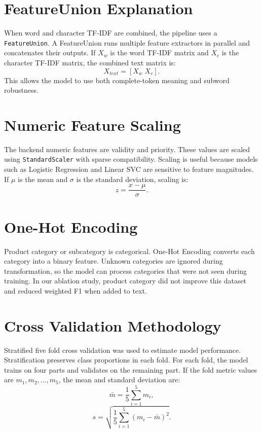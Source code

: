 \documentclass[12pt,a4paper,openany]{book}
\begin{document}
\section{FeatureUnion Explanation}
When word and character TF-IDF are combined, the pipeline uses a \texttt{FeatureUnion}. A FeatureUnion runs multiple feature extractors in parallel and concatenates their outputs. If $X_w$ is the word TF-IDF matrix and $X_c$ is the character TF-IDF matrix, the combined text matrix is:
\begin{equation}
X_{text}=[X_w \; X_c].
\end{equation}
This allows the model to use both complete-token meaning and subword robustness.

\section{Numeric Feature Scaling}
The backend numeric features are validity and priority. These values are scaled using \texttt{StandardScaler} with sparse compatibility. Scaling is useful because models such as Logistic Regression and Linear SVC are sensitive to feature magnitudes. If $\mu$ is the mean and $\sigma$ is the standard deviation, scaling is:
\begin{equation}
z=\frac{x-\mu}{\sigma}.
\end{equation}

\section{One-Hot Encoding}
Product category or subcategory is categorical. One-Hot Encoding converts each category into a binary feature. Unknown categories are ignored during transformation, so the model can process categories that were not seen during training. In our ablation study, product category did not improve this dataset and reduced weighted F1 when added to text.

\section{Cross Validation Methodology}
Stratified five fold cross validation was used to estimate model performance. Stratification preserves class proportions in each fold. For each fold, the model trains on four parts and validates on the remaining part. If the fold metric values are $m_1,m_2,\ldots,m_5$, the mean and standard deviation are:
\begin{equation}
\bar{m}=\frac{1}{5}\sum_{i=1}^{5}m_i,
\end{equation}
\begin{equation}
s=\sqrt{\frac{1}{5}\sum_{i=1}^{5}(m_i-\bar{m})^2}.
\end{equation}
\end{document}
